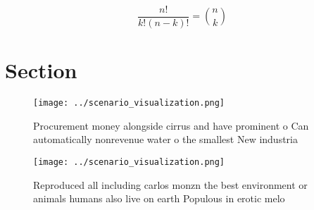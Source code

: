 \documentclass[a4paper]{article}
\begin{document}
\[ \frac{n!}{k!(n-k)!} = \binom{n}{k} \]

\section{Section}

\begin{figure}
\centering
\texttt{[image: ../scenario\_visualization.png]}
\caption{Procurement money alongside cirrus and have prominent o Can automatically nonrevenue water o the smallest New industria
}
\end{figure}
 
\begin{figure}
\centering
\texttt{[image: ../scenario\_visualization.png]}
\caption{Reproduced all including carlos monzn the best environment or animals humans also live on earth Populous in erotic melo
}
\end{figure}
 
\end{document}
